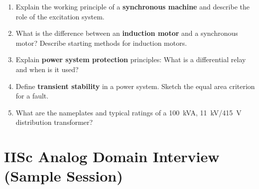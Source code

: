\begin{enumerate}[label=\textbf{P\arabic*.}, leftmargin=*, itemsep=6pt]

  \item Explain the working principle of a \textbf{synchronous machine} and
        describe the role of the excitation system.

  \item What is the difference between an \textbf{induction motor} and a
        synchronous motor? Describe starting methods for induction motors.

  \item Explain \textbf{power system protection} principles: What is a
        differential relay and when is it used?

  \item Define \textbf{transient stability} in a power system. Sketch the
        equal area criterion for a fault.

  \item What are the nameplates and typical ratings of a 100~kVA,
        11~kV/415~V distribution transformer?

\end{enumerate}

\section{IISc Analog Domain Interview (Sample Session)}
\label{sec:iisc-analog-session}

